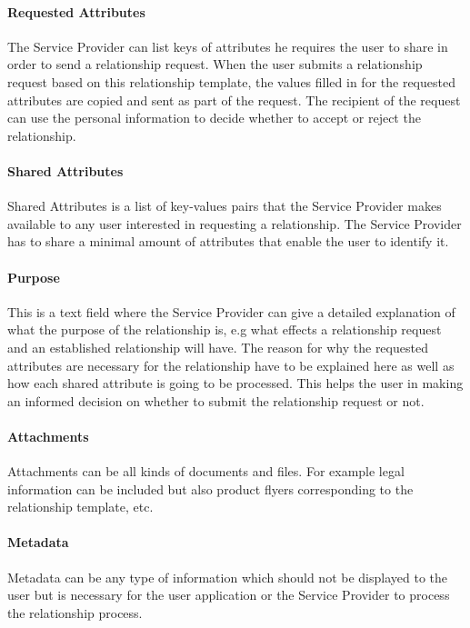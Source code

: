 \paragraph{Requested Attributes} The Service Provider can list keys of attributes he requires the user to share in order to send a relationship request. When the user submits a relationship request based on this relationship template, the values filled in for the requested attributes are copied and sent as part of the request. The recipient of the request can use the personal information to decide whether to accept or reject the relationship.
    
\paragraph{Shared Attributes} Shared Attributes is a list of key-values pairs that the Service Provider makes available to any user interested in requesting a relationship. The Service Provider has to share a minimal amount of attributes that enable the user to identify it. 
    
\paragraph{Purpose} This is a text field where the Service Provider can give a detailed explanation of what the purpose of the relationship is, e.g what effects a relationship request and an established relationship will have. The reason for why the requested attributes are necessary for the relationship have to be explained here as well as how each shared attribute is going to be processed. This helps the user in making an informed decision on whether to submit the relationship request or not.
    
\paragraph{Attachments} Attachments can be all kinds of documents and files. For example legal information can be included but also product flyers corresponding to the relationship template, etc.
    
\paragraph{Metadata} Metadata can be any type of information which should not be displayed to the user but is necessary for the user application or the Service Provider to process the relationship process.

